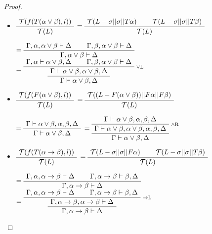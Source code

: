 {\begin{proof}
{\begin {itemize}
       
       $=\AxiomC{$\Gamma ,\alpha, \alpha \land \beta \vdash \Delta$}\AxiomC{$\Gamma , \beta, \alpha \land \beta \vdash \Delta$}\BinaryInfC{$\Gamma,\vdash  \alpha \land \beta  ,\Delta$}\DisplayProof$
       $=\RightLabel{\scriptsize{$\land$R}}\AxiomC{$\Gamma ,\alpha, \alpha \land \beta \vdash \Delta$}\AxiomC{$\Gamma , \beta, \alpha \land \beta \vdash \Delta$}\BinaryInfC{$\Gamma \vdash  \alpha \land \beta ,\alpha \land \beta, \Delta$}\UnaryInfC{$\Gamma,\vdash  \alpha \land \beta  ,\Delta$}\DisplayProof$
       \item 
   $\AxiomC{$\mathcal{T}( f(T(\alpha \lor \beta),l))$}\UnaryInfC{$\mathcal{T}(L)$}\DisplayProof$ 
   $=\AxiomC{$\mathcal{T}( L - \sigma|| \sigma || T \alpha)$}\AxiomC{$\mathcal{T}( L - \sigma|| \sigma || T \beta)$}\BinaryInfC{$\mathcal{T}(L)$}\DisplayProof$
   
   
   $=\AxiomC{$\Gamma ,\alpha , \alpha \lor \beta \vdash \Delta$}\AxiomC{$\Gamma ,\beta, \alpha \lor \beta \vdash \Delta$}\BinaryInfC{$\Gamma, \alpha \lor \beta \vdash \Delta$}\DisplayProof$
   $=\RightLabel{\scriptsize{$\lor$L}} \AxiomC{$\Gamma ,\alpha \vdash  \alpha \lor \beta,\Delta$}\AxiomC{$\Gamma , \beta, \alpha \lor \beta \vdash \Delta$}\BinaryInfC{$\Gamma \vdash  \alpha \lor \beta,\alpha \lor \beta ,\Delta$}\UnaryInfC{$\Gamma \vdash  \alpha \lor \beta ,\Delta$}\DisplayProof$
   \item 
   $\AxiomC{$\mathcal{T}( f(F(\alpha \lor \beta),l))$}\UnaryInfC{$\mathcal{T}(L)$}\DisplayProof$ 
   $=\AxiomC{$\mathcal{T}( (L-F(\alpha \lor \beta))||F \alpha||F \beta)$}\UnaryInfC{$\mathcal{T}(L)$}\DisplayProof$
   
   
   $=\AxiomC{$\Gamma \vdash \alpha \lor \beta,\alpha,\beta,\Delta$}\UnaryInfC{$\Gamma \vdash \alpha \lor \beta, \Delta$}\DisplayProof$
   $=\RightLabel{\scriptsize{$\land$R}}\AxiomC{$\Gamma \vdash \alpha \lor \beta,\alpha,\beta,\Delta$}\UnaryInfC{$\Gamma \vdash \alpha \lor \beta,\alpha \lor \beta,\alpha,\beta,\Delta$}\UnaryInfC{$\Gamma \vdash \alpha \lor \beta, \Delta$}\DisplayProof$
   \item 
   
   $\AxiomC{$\mathcal{T}( f(T(\alpha \rightarrow \beta),l))$}\UnaryInfC{$\mathcal{T}(L)$}\DisplayProof$  
   $=\AxiomC{$\mathcal{T}( L - \sigma|| \sigma || F \alpha )$}\AxiomC{$\mathcal{T}( L - \sigma|| \sigma || T \beta ) $}\BinaryInfC{$\mathcal{T}(L)$}\DisplayProof$  
   
   
   $=\AxiomC{$\Gamma, \alpha, \alpha \rightarrow \beta \vdash \Delta$}\AxiomC{$\Gamma, \alpha \rightarrow \beta \vdash  \beta, \Delta$}\BinaryInfC{$\Gamma, \alpha \rightarrow \beta \vdash \Delta$}\DisplayProof$  
   $=\RightLabel{\scriptsize{$\rightarrow$L}}\AxiomC{$\Gamma, \alpha, \alpha \rightarrow \beta \vdash \Delta$}\AxiomC{$\Gamma, \alpha \rightarrow \beta \vdash  \beta, \Delta$}\BinaryInfC{$\Gamma, \alpha \rightarrow \beta,\alpha \rightarrow \beta  \vdash \Delta$}\UnaryInfC{$\Gamma, \alpha \rightarrow \beta \vdash \Delta$}\DisplayProof$  
   

\end{itemize}}
\end{proof}}
